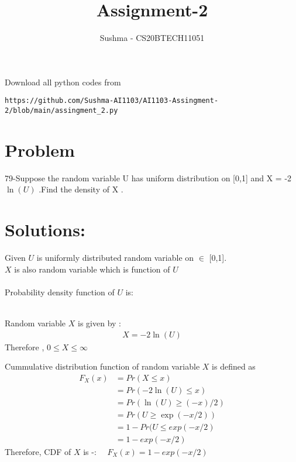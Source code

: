 \documentclass[journal,12pt,twocolumn]{IEEEtran}
\begin{document}
     \def\rightbox#1{\makebox[0in][r]{#1}}
     \def\centbox#1{\makebox[0in]{#1}}
     \def\topbox#1{\raisebox{-\baselineskip}[0in][0in]{#1}}
     \def\midbox#1{\raisebox{-0.5\baselineskip}[0in][0in]{#1}}
\vspace{3cm}
\title{Assignment-2}
\author{Sushma - CS20BTECH11051}
\maketitle
\newpage
\bigskip
\renewcommand{\thefigure}{\theenumi}
\renewcommand{\thetable}{\theenumi}
Download all python codes from 
\begin{lstlisting}
https://github.com/Sushma-AI1103/AI1103-Assingment-2/blob/main/assingment_2.py
\end{lstlisting}

 \section{Problem}{79}-Suppose the random variable U has uniform distribution on [0,1] and X = -2$\ln(U)$ .Find the  density of X  .
 
\section{Solutions:}
Given $U$ is uniformly distributed random variable on $\in$ [0,1]. \\ $X$ is also random variable which is function of $U$ \\ \\ 
Probability density function of $U$ is: \\ \\
Random variable $X$ is given by :
\begin{align}
  X = -2 \ln(U)
\end{align}
Therefore , $ 0 \leq X \leq \infty$

Cummulative distribution function of random variable $X$ is defined as \\
\begin{align}
    F_X(x) &= Pr(X \le x) \\
           &= Pr( -2 \ln(U)\le x) \\
           &= Pr(\ln(U) \ge( -x) /2)\\
           &= Pr (U \ge \exp(-x/2))\\
           &= 1 - Pr(U \le exp(-x/2)\\
           &= 1 - exp(-x/2)
\end{align}
Therefore, CDF of $X$ is -: \ \
$F_X(x) = 1- exp(-x/2)$\\
\end{document}
